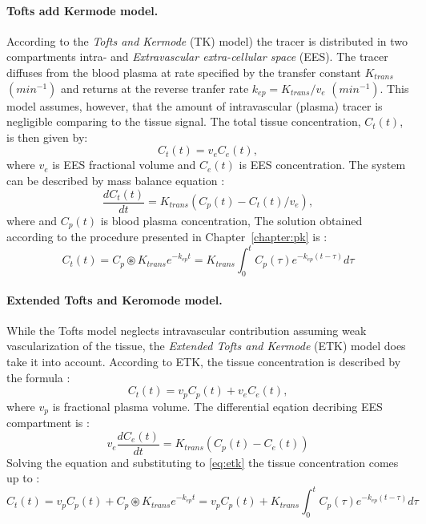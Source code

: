 \paragraph{Tofts add Kermode model.}
According to the \textit{Tofts and Kermode} (TK) model)\cite{tofts1991measurement} the tracer is distributed in two compartments intra- and \textit{Extravascular extra-cellular space} (EES).
The tracer diffuses from the blood plasma at rate specified by the transfer constant $K_{trans}$ $(min^{-1})$ and returns at the reverse tranfer rate $k_{ep} = K_{trans}/v_e$ $(min^{-1})$. This model assumes, however, that the amount of intravascular (plasma) tracer is negligible comparing to the tissue signal. The total tissue concentration, 
\newpage
\noindent $C_t(t)$, is then given by\cite{khalifa2014models}:
\begin{equation}
C_t(t) = v_eC_e(t),
\end{equation}
\noindent where $v_e$ is EES fractional volume and $C_e(t)$ is EES concentration. The system can be described by mass balance equation  \cite{khalifa2014models, tofts1999estimating}: 
\begin{equation}
	\label{eq:toft}
	\frac{dC_{t}(t)}{dt} = K_{trans}(C_p(t)-C_t(t)/v_e),
\end{equation} 
where  and $C_p(t)$ is blood plasma concentration, The solution obtained according to the procedure presented in Chapter~\ref{chapter:pk} is \cite{sourbron2011scope, khalifa2014models}:
\begin{equation}
	\label{eq:toft2}
	C_{t}(t) =C_p\circledast K_{trans}e^{-k_{ep}t} =K_{trans}\int_{0}^{t}C_p(\tau)e^{-k_{ep}(t-\tau)}d\tau  
\end{equation}
\paragraph{Extended Tofts and Keromode model.}
While the Tofts model neglects intravascular contribution assuming weak vascularization of the tissue, the \textit{Extended Tofts and Kermode} (ETK) model \cite{tofts1997modeling} does take it into account. According to ETK, the tissue concentration is described by the formula \cite{tofts2010t1, khalifa2014models}:
\begin{equation}
C_t(t) = v_pC_p(t) + v_eC_e(t),
\label{eq:etk}
\end{equation}
where $v_p$ is fractional plasma volume. The differential eqation decribing EES compartment is \cite{sourbron2011scope}:
\begin{equation}
	\label{eq:etoft}
	v_e\frac{dC_{e}(t)}{dt} = K_{trans}(C_p(t)-C_e(t))
\end{equation}
Solving the equation and substituting to \ref{eq:etk} the tissue concentration comes up to \cite{khalifa2014models, tofts2010t1}:
\begin{equation}
	\label{eq:extended_toft}
	C_{t}(t) =v_pC_p(t) + C_p\circledast K_{trans}e^{-k_{ep}t} = v_pC_p(t)+K_{trans}\int_{0}^{t}C_p(\tau)e^{-k_{ep}(t-\tau)}d\tau 
\end{equation}
\newpage

